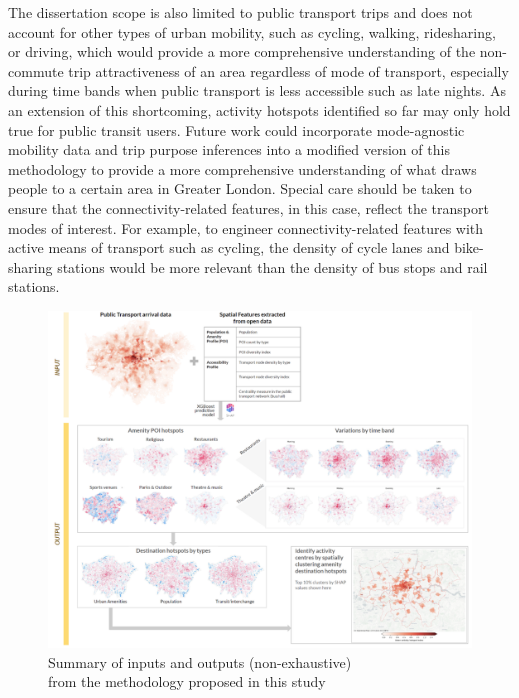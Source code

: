 The dissertation scope is also limited to public transport trips and does not account for other types of urban mobility, such as cycling, walking, ridesharing, or driving, which would provide a more comprehensive understanding of the non-commute trip attractiveness of an area regardless of mode of transport, especially during time bands when public transport is less accessible such as late nights. As an extension of this shortcoming, activity hotspots identified so far may only hold true for public transit users. Future work could incorporate mode-agnostic mobility data and trip purpose inferences into a modified version of this methodology to provide a more comprehensive understanding of what draws people to a certain area in Greater London. Special care should be taken to ensure that the connectivity-related features, in this case, reflect the transport modes of interest. For example, to engineer connectivity-related features with active means of transport such as cycling, the density of cycle lanes and bike-sharing stations would be more relevant than the density of bus stops and rail stations.

\begin{figure}[!hbt]
    \centering
    \includegraphics[width=\textwidth]{summary.png}
    \captionsetup{justification=centering}
    \caption{Summary of inputs and outputs (non-exhaustive)\\from the methodology proposed in this study}
    \label{fig:summary}
\end{figure}
